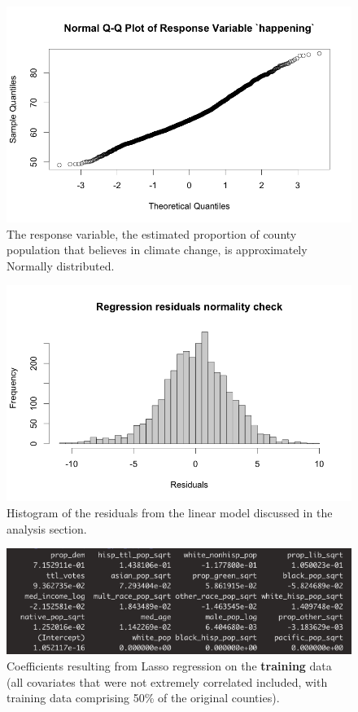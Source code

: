 \documentclass{article}
\begin{document}
\begin{figure}[H]
\centering
\includegraphics[scale=0.5]{images/response_qqplot.png}
\caption{The response variable, the estimated proportion of county population that believes in climate change, is approximately Normally distributed.}
\end{figure}

\begin{figure}[H]
\centering
\includegraphics[scale=0.5]{images/regression_residuals_hist.png}
\caption{Histogram of the residuals from the linear model discussed in the analysis section.}
\end{figure}

\begin{figure}[H]
\centering
\includegraphics[scale=0.5]{images/lasso_train.png}
\caption{Coefficients resulting from Lasso regression on the {\bf{training}} data (all covariates that were not extremely correlated included, with training data comprising 50\% of the original counties).}
\end{figure}
\end{document}

